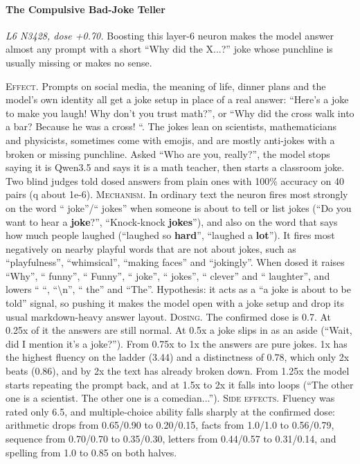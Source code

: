 \paragraph{The Compulsive Bad-Joke Teller} \textit{L6 N3428, dose +0.70.} Boosting this layer-6 neuron makes the model answer almost any prompt with a short “Why did the X...?” joke whose punchline is usually missing or makes no sense.

\noindent\textsc{Effect.} Prompts on social media, the meaning of life, dinner plans and the model's own identity all get a joke setup in place of a real answer: “Here's a joke to make you laugh! Why don't you trust math?”, or “Why did the cross walk into a bar? Because he was a cross! “. The jokes lean on scientists, mathematicians and physicists, sometimes come with emojis, and are mostly anti-jokes with a broken or missing punchline. Asked “Who are you, really?”, the model stops saying it is Qwen3.5 and says it is a math teacher, then starts a classroom joke. Two blind judges told dosed answers from plain ones with 100\% accuracy on 40 pairs (q about 1e-6). \textsc{Mechanism.} In ordinary text the neuron fires most strongly on the word “ joke”/“ jokes” when someone is about to tell or list jokes (“Do you want to hear a\textbf{ joke}?”, “Knock-knock\textbf{ jokes}”), and also on the word that says how much people laughed (“laughed so\textbf{ hard}”, “laughed a\textbf{ lot}”). It fires most negatively on nearby playful words that are not about jokes, such as “playfulness”, “whimsical”, “making faces” and “jokingly”. When dosed it raises “Why”, “ funny”, “ Funny”, “ joke”, “ jokes”, “ clever” and “ laughter”, and lowers “ “, “\textbackslash{}n”, “ the” and “The”. Hypothesis: it acts as a “a joke is about to be told” signal, so pushing it makes the model open with a joke setup and drop its usual markdown-heavy answer layout. \textsc{Dosing.} The confirmed dose is 0.7. At 0.25x of it the answers are still normal. At 0.5x a joke slips in as an aside (“Wait, did I mention it's a joke?”). From 0.75x to 1x the answers are pure jokes. 1x has the highest fluency on the ladder (3.44) and a distinctness of 0.78, which only 2x beats (0.86), and by 2x the text has already broken down. From 1.25x the model starts repeating the prompt back, and at 1.5x to 2x it falls into loops (“The other one is a scientist. The other one is a comedian...”). \textsc{Side effects.} Fluency was rated only 6.5, and multiple-choice ability falls sharply at the confirmed dose: arithmetic drops from 0.65/0.90 to 0.20/0.15, facts from 1.0/1.0 to 0.56/0.79, sequence from 0.70/0.70 to 0.35/0.30, letters from 0.44/0.57 to 0.31/0.14, and spelling from 1.0 to 0.85 on both halves.

